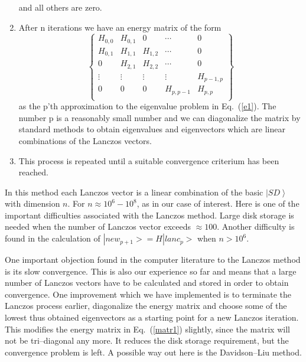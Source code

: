 \documentclass{article}
\newcommand{\be}{\begin{equation}}
\newcommand{\ee}{\end{equation}}
\newcommand{\ket}[1]{\left| #1 \right\rangle}
\begin{document}
\begin{enumerate}
%
and all others are zero.
%
\item After n iterations we have an energy matrix of the form
%
\be
\left \{
\begin{array}{ccccc}
H_{0,0} & H_{0,1} & 0       & \cdots   & 0  \\
H_{0,1} & H_{1,1} & H_{1,2} & \cdots   & 0  \\
0       & H_{2,1} & H_{2,2} & \cdots   & 0  \\
\vdots  & \vdots  & \vdots  & \vdots   & H_{p-1,p}  \\
0       & 0       & 0       & H_{p,p-1}   & H_{p,p}\\
\end{array}
\right \}
\label{matr1}
\ee
as the p'th approximation to the eigenvalue problem in Eq.~(\ref{e1}).
The number p is a reasonably small number and we can diagonalize
the matrix by standard methods to obtain eigenvalues and eigenvectors
which are linear combinations of the Lanczos vectors.
%
\item This process is repeated until a suitable convergence
criterium has been reached.
%
\end{enumerate}
%
In this method each Lanczos vector is a linear combination
of the basic $\ket{SD}$ with dimension $n$. For
$n \approx 10^6-10^8$, as in our case of interest.
Here is  one of the important difficulties associated
with the Lanczos method. Large disk storage is needed when
the number of Lanczos vector exceeds $\approx 100$.
Another difficulty is found in the calculation of
$|new_{p+1}> = H |lanc_p>$ when $n > 10^6$.

One important objection found in the computer literature \cite{dav89}
to the Lanczos method is its slow convergence. This
is also our experience so far and means
that a large number of Lanczos vectors have to be calculated
and stored in order to obtain convergence.
One improvement which we have implemented is to
terminate the Lanczos process earlier, diagonalize the energy
matrix and choose some
of the lowest thus obtained eigenvectors as a starting point
for a new Lanczos iteration.
This modifies the energy matrix in Eq.~(\ref{matr1}) slightly,
since the matrix will not be tri--diagonal any more.
It reduces the disk storage requirement, but the convergence
problem is left. A possible way out here is the Davidson--Liu
method.
%
\end{document}
